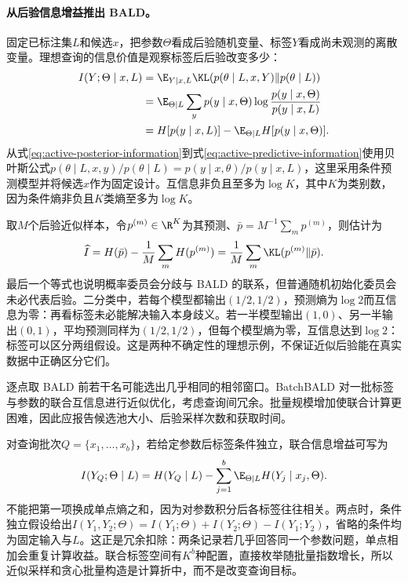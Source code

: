 \paragraph{从后验信息增益推出 BALD。}
固定已标注集$L$和候选$x$，把参数$\Theta$看成后验随机变量、标签$Y$看成尚未观测的离散变量。理想查询的信息价值是观察标签后后验改变多少：
\begin{align}
 I(Y;\Theta\mid x,L)
 &=\E_{Y\mid x,L}\KL(p(\theta\mid L,x,Y)\|p(\theta\mid L))\label{eq:active-posterior-information}\\
 &=\E_{\Theta\mid L}\sum_yp(y\mid x,\Theta)
 \log\frac{p(y\mid x,\Theta)}{p(y\mid x,L)}\label{eq:active-predictive-information}\\
 &=H[p(y\mid x,L)]-\E_{\Theta\mid L}H[p(y\mid x,\Theta)].
\end{align}
从式\eqref{eq:active-posterior-information}到式\eqref{eq:active-predictive-information}使用贝叶斯公式$p(\theta\mid L,x,y)/p(\theta\mid L)=p(y\mid x,\theta)/p(y\mid x,L)$，这里采用条件预测模型并将候选$x$作为固定设计。互信息非负且至多为$\log K$，其中$K$为类别数，因为条件熵非负且$K$类熵至多为$\log K$。

取$M$个后验近似样本，令$p^{(m)}\in\R^K$为其预测、$\bar p=M^{-1}\sum_mp^{(m)}$，则估计为
\begin{equation}
 \widehat I=H(\bar p)-\frac1M\sum_mH(p^{(m)})
 =\frac1M\sum_m\KL(p^{(m)}\|\bar p).
\end{equation}
最后一个等式也说明概率委员会分歧与 BALD 的联系，但普通随机初始化委员会未必代表后验。二分类中，若每个模型都输出$(1/2,1/2)$，预测熵为$\log2$而互信息为零：再看标签未必能解决输入本身歧义。若一半模型输出$(1,0)$、另一半输出$(0,1)$，平均预测同样为$(1/2,1/2)$，但每个模型熵为零，互信息达到$\log2$：标签可以区分两组假设。这是两种不确定性的理想示例，不保证近似后验能在真实数据中正确区分它们。

逐点取 BALD 前若干名可能选出几乎相同的相邻窗口。BatchBALD 对一批标签与参数的联合互信息进行近似优化，考虑查询间冗余\cite{kirsch2019batchbald}。批量规模增加使联合计算更困难，因此应报告候选池大小、后验采样次数和获取时间。

对查询批次$Q=\{x_1,\ldots,x_b\}$，若给定参数后标签条件独立，联合信息增益可写为
\begin{equation}
 I(Y_Q;\Theta\mid L)=H(Y_Q\mid L)-\sum_{j=1}^b\E_{\Theta\mid L}H(Y_j\mid x_j,\Theta).
\end{equation}
不能把第一项换成单点熵之和，因为对参数积分后各标签往往相关。两点时，条件独立假设给出$I(Y_1,Y_2;\Theta)=I(Y_1;\Theta)+I(Y_2;\Theta)-I(Y_1;Y_2)$，省略的条件均为固定输入与$L$。这正是冗余扣除：两条记录若几乎回答同一个参数问题，单点相加会重复计算收益。联合标签空间有$K^b$种配置，直接枚举随批量指数增长，所以近似采样和贪心批量构造是计算折中，而不是改变查询目标。

